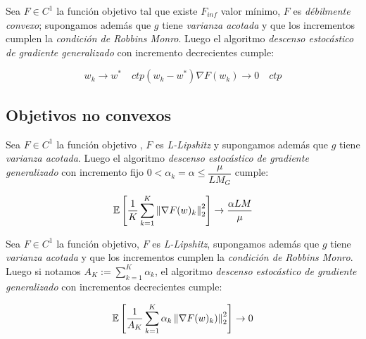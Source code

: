 \begin{theorem}
	Sea $F \in C^1$ la funci\'on objetivo tal que existe $F_{inf}$ valor m\'inimo, $F$ es \textit{d\'ebilmente convexo}; supongamos adem\'as que $g$ tiene \textit{varianza acotada} y que los incrementos cumplen la \textit{condici\'on de Robbins Monro}. Luego el algoritmo \textit{descenso estoc\'astico de gradiente generalizado} con incremento decrecientes cumple:
	
	\begin{subequations}
		\begin{equation*}
		w_k \rightarrow w^* \quad ctp
		\end{equation*}
		\begin{equation*}
		\left(w_k - w^*\right) \nabla F(w_k) \rightarrow 0 \quad ctp
		\end{equation*}
	\end{subequations}
	
\end{theorem}

\subsection{Objetivos no convexos}

\begin{theorem}
	Sea $F \in C^1$ la funci\'on objetivo , $F$ es \textit{L-Lipshitz} y supongamos adem\'as que $g$ tiene \textit{varianza acotada}. Luego el algoritmo \textit{descenso estoc\'astico de gradiente generalizado} con incremento fijo $0  < \alpha_k = \alpha \leq \dfrac{\mu}{LM_G} $ cumple:
	
	\begin{equation*}
		\mathbb{E} \left[\dfrac{1}{K}\sum\limits_{k=1}^{K} {\left\lVert\nabla F (w)_k\right\rVert_2^2}\right] \rightarrow  \dfrac{\alpha LM}{\mu}
	\end{equation*}
	
\end{theorem}

\begin{theorem}
	Sea $F \in C^1$ la funci\'on objetivo, $F$ es \textit{L-Lipshitz}, supongamos adem\'as que $g$ tiene \textit{varianza acotada} y que los incrementos cumplen la \textit{condici\'on de Robbins Monro}. Luego si notamos $A_K := \sum\limits_{k=1}^{K} {\alpha_k}$, el algoritmo \textit{descenso estoc\'astico de gradiente generalizado} con incrementos decrecientes cumple:
	
	\begin{equation*}
		\mathbb{E} \left[\dfrac{1}{A_K}\sum\limits_{k=1}^{K} {\alpha_k \left\lVert\nabla F (w)_k)\right\rVert_2^2}\right] \rightarrow 0
	\end{equation*}
	
\end{theorem}


